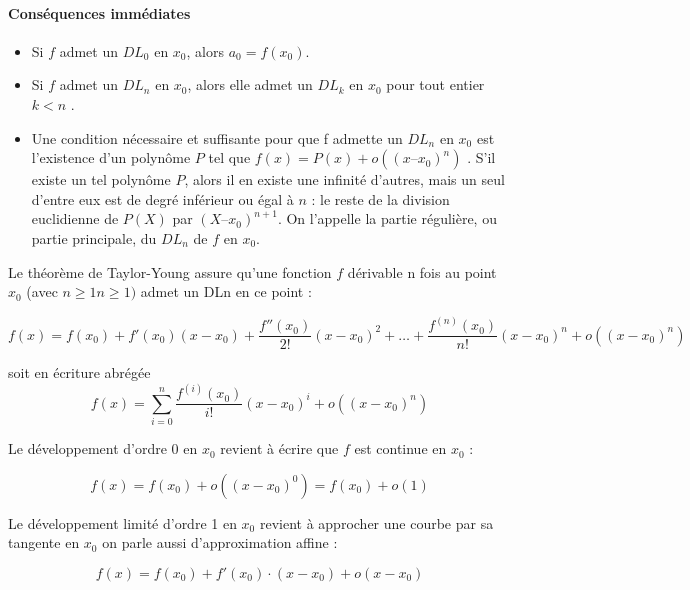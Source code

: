 		\paragraph*{Conséquences immédiates}
		\begin{itemize}
			\item Si $f$ admet un $DL_0$ en $x_0$, alors $a_0 = f(x_0)$. \cite{coulombeau2013math}
			\item Si $f$ admet un $DL_n$ en $x_0$, alors elle admet un $DL_k$ en $x_0$ pour tout entier $k < n$ \cite{coulombeau2013math}.
			\item Une condition nécessaire et suffisante pour que f admette un $DL_n$ en $x_0$ est l'existence d'un polynôme $P$ tel que $f(x) = P(x) + o((x – x_0)^n)$ \cite{coulombeau2013math}. S'il existe un tel polynôme $P$, alors il en existe une infinité d'autres, mais un seul d'entre eux est de degré inférieur ou égal à $n$ : le reste de la division euclidienne de $P(X)$ par $(X – x_0)^{n+1}$. On l'appelle la partie régulière, ou partie principale, du $DL_n$ de $f$ en $x_0$. %
		\end{itemize}
		
		
			
		Le théorème de Taylor-Young assure \cite[][p. 241]{coulombeau2013math} qu'une fonction $f$ dérivable n fois au point $x_0$ (avec ${\displaystyle n\geq 1}n\geq 1)$ admet un DLn en ce point :
		
		$$
			{\displaystyle f(x)=f(x_{0})+f'(x_{0})(x-x_{0})+{\frac {f''(x_{0})}{2!}}(x-x_{0})^{2}+\dots +{\frac {f^{(n)}(x_{0})}{n!}}(x-x_{0})^{n}+o((x-x_{0})^{n})}
		$$
		
		soit en écriture abrégée
		$$
			f(x)=\sum _{{i=0}}^{n}{\frac  {f^{{(i)}}(x_{0})}{i!}}(x-x_{0})^{i}+o((x-x_{0})^{n})
		$$
		
		Le développement d'ordre $0$ en $x_0$ revient à écrire que $f$ est continue en $x_0$ :
		
		$$
		{\displaystyle f(x)=f(x_{0})+o((x-x_{0})^{0})=f(x_{0})+o(1)}
		$$
		
		Le développement limité d'ordre 1 en $x_0$ revient à approcher une courbe par sa tangente en $x_0$ on parle aussi d'approximation affine :
		
		$$
		f(x)=f(x_{0})+f'(x_{0})\cdot (x-x_{0})+o(x-x_{0})
		$$
		
			
